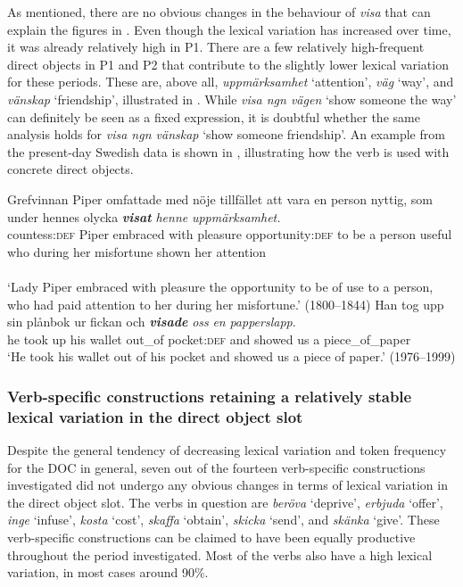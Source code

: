 \documentclass[output=paper]{langscibook}
\begin{document}
As mentioned, there are no obvious changes in the behaviour of \textit{visa} that can explain the figures in . Even though the lexical variation has increased over time, it was already relatively high in P1. There are a few relatively high-frequent direct objects in P1 and P2 that contribute to the slightly lower lexical variation for these periods. These are, above all, \textit{uppmärksamhet} ‘attention’, \textit{väg} ‘way’, and \textit{vänskap} ‘friendship’, illustrated in . While \textit{visa ngn vägen} ‘show someone the way’ can definitely be seen as a fixed expression, it is doubtful whether the same analysis holds for \textit{visa ngn vänskap} ‘show someone friendship’. An example from the present-day Swedish data is shown in , illustrating how the verb is used with concrete direct objects.


\ea \label{ex:valdeson:18}
\gll Grefvinnan    Piper  omfattade    med  nöje       tillfället att vara en person nyttig, som under hennes  olycka \textbf{\textit{visat}} \textit{henne}      \textit{uppmärksamhet.}\\
  countess:\textsc{def}  Piper  embraced    with  pleasure  opportunity:\textsc{def} to  be       a     person useful who during her misfortune shown   her       attention\\\\
\glt ‘Lady Piper embraced with pleasure the opportunity to be of use to a person, who had paid attention to her during her misfortune.’ (1800–1844)
\ex \label{ex:valdeson:19}
\gll Han  tog     upp    sin    plånbok  ur     fickan {och} \textbf{\textit{visade}} \textit{oss}   \textit{en}  \textit{papperslapp}.\\
  he       took    up       his     wallet     out\_of pocket:\textsc{def} and    showed    us    a  piece\_of\_paper\\
\glt `He took his wallet out of his pocket and showed us a piece of paper.’ (1976–1999)
\z

\subsubsection{Verb-specific constructions retaining a relatively stable lexical variation in the direct object slot}\label{sec:valdeson:5.3.3}


Despite the general tendency of decreasing lexical variation and token frequency for the DOC in general, seven out of the fourteen verb-specific constructions investigated did not undergo any obvious changes in terms of lexical variation in the direct object slot. The verbs in question are \textit{beröva} ‘deprive’, \textit{erbjuda} ‘offer’, \textit{inge} ‘infuse’, \textit{kosta} ‘cost’, \textit{skaffa} ‘obtain’, \textit{skicka} ‘send’, and \textit{skänka} ‘give’. These verb-specific constructions can be claimed to have been equally productive throughout the period investigated. Most of the verbs also have a high lexical variation, in most cases around 90\%.
\end{document}
